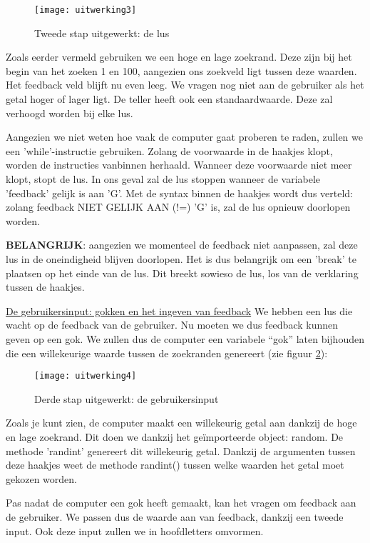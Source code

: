 \begin{figure}
    \texttt{[image: uitwerking3]}
    \caption{Tweede stap uitgewerkt: de lus}
    \label{fig:uitwerking3}
\end{figure}

Zoals eerder vermeld gebruiken we een hoge en lage zoekrand. Deze zijn bij het begin van het zoeken 1 en 100, aangezien ons zoekveld ligt tussen deze waarden.
Het feedback veld blijft nu even leeg. We vragen nog niet aan de gebruiker als het getal hoger of lager ligt.
De teller heeft ook een standaardwaarde. Deze zal verhoogd worden bij elke lus.

Aangezien we niet weten hoe vaak de computer gaat proberen te raden, zullen we een 'while'-instructie gebruiken. Zolang de voorwaarde in de haakjes klopt, worden de instructies vanbinnen herhaald. 
Wanneer deze voorwaarde niet meer klopt, stopt de lus.
In ons geval zal de lus stoppen wanneer de variabele 'feedback' gelijk is aan 'G'. 
Met de syntax binnen de haakjes wordt dus verteld: 
zolang feedback NIET GELIJK AAN (!=) 'G' is, zal de lus opnieuw doorlopen worden.

\textbf{BELANGRIJK}: aangezien we momenteel de feedback niet aanpassen, zal deze lus in de oneindigheid blijven doorlopen. Het is dus belangrijk om een 'break' te plaatsen op het einde van de lus. Dit breekt sowieso de lus, los van de verklaring tussen de haakjes.

\underline{De gebruikersinput: gokken en het ingeven van feedback}
We hebben een lus die wacht op de feedback van de gebruiker. Nu moeten we dus feedback kunnen geven op een gok. We zullen dus de computer een variabele “gok” laten bijhouden die een willekeurige waarde tussen de zoekranden genereert (zie figuur \ref{fig:uitwerking4}):

\begin{figure}
    \texttt{[image: uitwerking4]}
    \caption{Derde stap uitgewerkt: de gebruikersinput}
    \label{fig:uitwerking4}
\end{figure}

Zoals je kunt zien, de computer maakt een willekeurig getal aan dankzij de hoge en lage zoekrand. Dit doen we dankzij het geïmporteerde object: random. De methode 'randint' genereert dit willekeurig getal. Dankzij de argumenten tussen deze haakjes weet de methode randint() tussen welke waarden het getal moet gekozen worden.

Pas nadat de computer een gok heeft gemaakt, kan het vragen om feedback aan de gebruiker. We passen dus de waarde aan van feedback, dankzij een tweede input. Ook deze input zullen we in hoofdletters omvormen.

